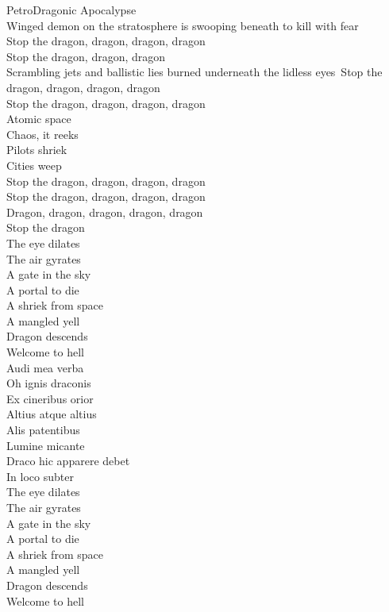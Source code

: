 PetroDragonic Apocalypse \\

Winged demon on the stratosphere is swooping beneath to kill with fear \\
Stop the dragon, dragon, dragon, dragon \\
Stop the dragon, dragon, dragon \\
Scrambling jets and ballistic lies burned underneath the lidless eyes\
Stop the dragon, dragon, dragon, dragon \\
Stop the dragon, dragon, dragon, dragon \\
Atomic space \\
Chaos, it reeks \\
Pilots shriek \\
Cities weep \\
Stop the dragon, dragon, dragon, dragon \\
Stop the dragon, dragon, dragon, dragon \\
Dragon, dragon, dragon, dragon, dragon \\
Stop the dragon \\

The eye dilates \\
The air gyrates \\
A gate in the sky \\
A portal to die \\
A shriek from space \\
A mangled yell \\
Dragon descends \\
Welcome to hell \\

Audi mea verba \\
Oh ignis draconis \\
Ex cineribus orior \\
Altius atque altius \\
Alis patentibus \\
Lumine micante \\
Draco hic apparere debet \\
In loco subter \\

The eye dilates \\
The air gyrates \\
A gate in the sky \\
A portal to die \\
A shriek from space \\
A mangled yell \\
Dragon descends \\
Welcome to hell \\

